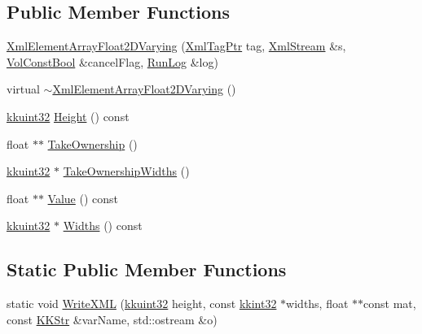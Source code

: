 \subsection*{Public Member Functions}
\begin{DoxyCompactItemize}
\item 
\hyperlink{class_k_k_b_1_1_xml_element_array_float2_d_varying_aacca96d12ebba71cf93a54e339bc9581}{Xml\+Element\+Array\+Float2\+D\+Varying} (\hyperlink{namespace_k_k_b_a9253a3ea8a5da18ca82be4ca2b390ef0}{Xml\+Tag\+Ptr} tag, \hyperlink{class_k_k_b_1_1_xml_stream}{Xml\+Stream} \&s, \hyperlink{namespace_k_k_b_a7d390f568e2831fb76b86b56c87bf92f}{Vol\+Const\+Bool} \&cancel\+Flag, \hyperlink{class_k_k_b_1_1_run_log}{Run\+Log} \&log)
\item 
virtual \hyperlink{class_k_k_b_1_1_xml_element_array_float2_d_varying_af2023b225e7a10088ecea82bb6046f2b}{$\sim$\+Xml\+Element\+Array\+Float2\+D\+Varying} ()
\item 
\hyperlink{namespace_k_k_b_af8d832f05c54994a1cce25bd5743e19a}{kkuint32} \hyperlink{class_k_k_b_1_1_xml_element_array_float2_d_varying_a89a9805bd91bf8db908450d763501cf7}{Height} () const 
\item 
float $\ast$$\ast$ \hyperlink{class_k_k_b_1_1_xml_element_array_float2_d_varying_a832e4f16a69004742d47b6970bcc44b3}{Take\+Ownership} ()
\item 
\hyperlink{namespace_k_k_b_af8d832f05c54994a1cce25bd5743e19a}{kkuint32} $\ast$ \hyperlink{class_k_k_b_1_1_xml_element_array_float2_d_varying_ae727d8df514102c39399996777639aac}{Take\+Ownership\+Widths} ()
\item 
float $\ast$$\ast$ \hyperlink{class_k_k_b_1_1_xml_element_array_float2_d_varying_a880212291e7d1b7d7fe1aae6693b0bed}{Value} () const 
\item 
\hyperlink{namespace_k_k_b_af8d832f05c54994a1cce25bd5743e19a}{kkuint32} $\ast$ \hyperlink{class_k_k_b_1_1_xml_element_array_float2_d_varying_a87c4c27d22770df25a5c20f9caa68914}{Widths} () const 
\end{DoxyCompactItemize}
\subsection*{Static Public Member Functions}
\begin{DoxyCompactItemize}
\item 
static void \hyperlink{class_k_k_b_1_1_xml_element_array_float2_d_varying_a0984ce67f7d0b713e151e43d636fe44e}{Write\+X\+ML} (\hyperlink{namespace_k_k_b_af8d832f05c54994a1cce25bd5743e19a}{kkuint32} height, const \hyperlink{namespace_k_k_b_a8fa4952cc84fda1de4bec1fbdd8d5b1b}{kkint32} $\ast$widths, float $\ast$$\ast$const mat, const \hyperlink{class_k_k_b_1_1_k_k_str}{K\+K\+Str} \&var\+Name, std\+::ostream \&o)
\end{DoxyCompactItemize}
